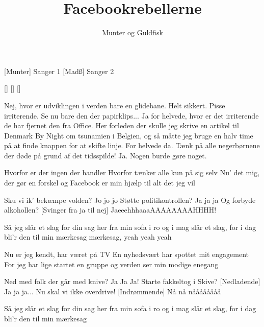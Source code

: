 \documentclass[a4paper,11pt]{article}
\title{Facebookrebellerne}
\author{Munter og Guldfisk}
\begin{document}
\maketitle

\begin{roles}
[Munter] Sanger 1
[Madß] Sanger 2
\end{roles}

\begin{props}
[] 
[] 
[] 
\end{props}

\begin{song}

 Nej, hvor er udviklingen i verden bare en glidebane.
 Helt sikkert. Pisse irriterende.
 Se nu bare den der papirklips...
 Ja for helvede, hvor er det irriterende de har fjernet den fra Office.
 Her forleden der skulle jeg skrive en artikel til Denmark By Night om tsunamien i Belgien, og så måtte jeg bruge en halv time på at finde knappen for at skifte linje.
 For helvede da. Tænk på alle negerbørnene der døde på grund af det tidsspilde!
 Ja. Nogen burde gøre noget.


 Hvorfor er der ingen der handler
	Hvorfor tænker alle kun på sig selv
	Nu' det mig, der gør en forskel
	og Facebook er min hjælp til alt det jeg vil

 Sku vi ik' bekæmpe volden?
 Jo jo jo
 Støtte politikontrollen?
 Ja ja ja
	Og forbyde alkohollen?
[Svinger fra ja til nej] JaeeehhhaaaAAAAAAAAHHHH! 

 Så jeg slår et slag for din sag
	her fra min sofa i ro og i mag
	slår et slag, for i dag
	bli'r den til min mærkesag
	mærkesag, yeah yeah yeah

 Nu er jeg kendt, har været på TV
	En nyhedsvært har spottet mit engagement
	For jeg har lige startet en gruppe
	og verden ser min modige enegang

 Ned med folk der går med knive?
 Ja Ja Ja!
 Starte fakkeltog i Skive?
[Nedladende] Ja ja ja...
    Nu skal vi ikke overdrive!
[Indrømmende] Nå nå nåååååååå

 Så jeg slår et slag for din sag
	her fra min sofa i ro og i mag
	slår et slag, for i dag
	bli'r den til min mærkesag


\end{song}
\end{document}
